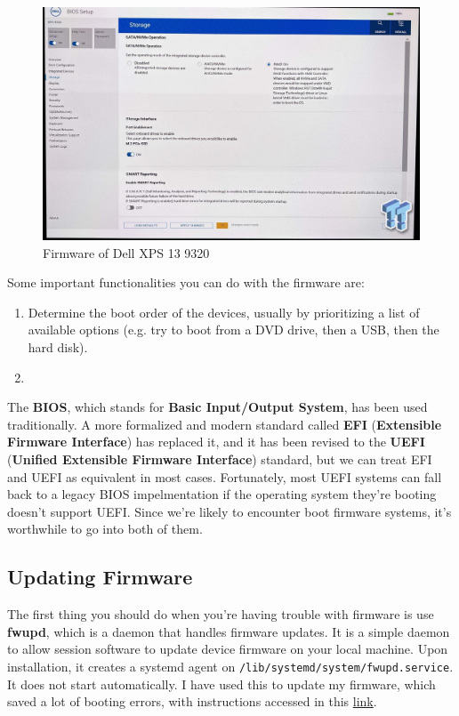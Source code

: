 \documentclass{article}
\theoremstyle{definition}
\begin{document}
  \begin{figure}[hbt!]
    \centering 
    \includegraphics[scale=0.3]{img/xps_firmware.jpg}
    \caption{Firmware of Dell XPS 13 9320} 
    \label{fig:xps_firmware}
  \end{figure}

  Some important functionalities you can do with the firmware are: 
  \begin{enumerate} 
    \item Determine the boot order of the devices, usually by prioritizing a list of available options (e.g. try to boot from a DVD drive, then a USB, then the hard disk). 
    \item 
  \end{enumerate}

  The \textbf{BIOS}, which stands for \textbf{Basic Input/Output System}, has been used traditionally. A more formalized and modern standard called \textbf{EFI} (\textbf{Extensible Firmware Interface}) has replaced it, and it has been revised to the \textbf{UEFI} (\textbf{Unified Extensible Firmware Interface}) standard, but we can treat EFI and UEFI as equivalent in most cases. Fortunately, most UEFI systems can fall back to a legacy BIOS impelmentation if the operating system they're booting doesn't support UEFI. Since we're likely to encounter boot firmware systems, it's worthwhile to go into both of them. 

  \subsection{Updating Firmware}

    The first thing you should do when you're having trouble with firmware is use \textbf{fwupd}, which is a daemon that handles firmware updates. It is a simple daemon to allow session software to update device firmware on your local machine. Upon installation, it creates a systemd agent on \texttt{/lib/systemd/system/fwupd.service}. It does not start automatically. I have used this to update my firmware, which saved a lot of booting errors, with instructions accessed in this \href{https://wiki.archlinux.org/title/fwupd}{link}. 
\end{document}
